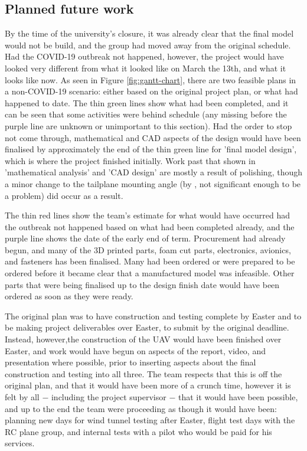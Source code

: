 \documentclass[../../main.tex]{subfiles}
\begin{document}
\subsection{Planned future work} \label{sec:project-review:planned-future-work}

By the time of the university's closure, it was already clear that the final model would not be build, and the group had moved away from the original schedule.
Had the COVID-19 outbreak not happened, however, the project would have looked very different from what it looked like on March the 13th, and what it looks like now.
As seen in Figure \ref{fig:gantt-chart}, there are two feasible plans in a non-COVID-19 scenario: either based on the original project plan, or what had happened to date.
The thin green lines show what had been completed, and it can be seen that some activities were behind schedule (any missing before the purple line are unknown or unimportant to this section).
Had the order to stop not come through, mathematical and CAD aspects of the design would have been finalised by approximately the end of the thin green line for 'final model design', which is where the project finished initially.
Work past that shown in 'mathematical analysis' and 'CAD design' are mostly a result of polishing, though a minor change to the tailplane mounting angle (by , not significant enough to be a problem) did occur as a result.  

The thin red lines show the team's estimate for what would have occurred had the outbreak not happened based on what had been completed already, and the purple line shows the date of the early end of term.
Procurement had already begun, and many of the 3D printed parts, foam cut parts, electronics, avionics, and fasteners has been finalised.
Many had been ordered or were prepared to be ordered before it became clear that a manufactured model was infeasible.
Other parts that were being finalised up to the design finish date would have been ordered as soon as they were ready.  


The original plan was to have construction and testing complete by Easter and to be making project deliverables over Easter, to submit by the original deadline.
Instead, however,the construction of the UAV would have been finished over Easter, and work would have begun on aspects of the report, video, and presentation where possible, prior to inserting aspects about the final construction and testing into all three.
The team respects that this is off the original plan, and that it would have been more of a crunch time, however it is felt by all $-$ including the project supervisor $-$ that it would have been possible, and up to the end the team were proceeding as though it would have been: planning new days for wind tunnel testing after Easter, flight test days with the RC plane group, and internal tests with a pilot who would be paid for his services.  
\end{document}
